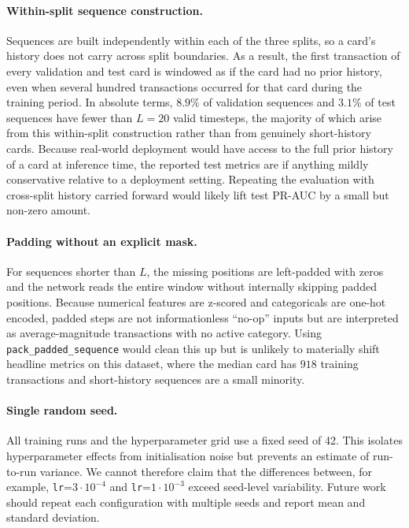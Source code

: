 \documentclass[oneside,12pt,parskip=half,american,numbers=noenddot]{scrreprt}
\begin{document}
\paragraph{Within-split sequence construction.}
Sequences are built independently within each of the three splits, so 
a card's history does not carry across split boundaries. As a result, 
the first transaction of every validation and test card is windowed 
as if the card had no prior history, even when several hundred 
transactions occurred for that card during the training period. In 
absolute terms, $8.9\%$ of validation sequences and $3.1\%$ of test 
sequences have fewer than $L=20$ valid timesteps, the majority of 
which arise from this within-split construction rather than from 
genuinely short-history cards. Because real-world deployment would 
have access to the full prior history of a card at inference time, 
the reported test metrics are if anything mildly conservative relative 
to a deployment setting. Repeating the evaluation with cross-split 
history carried forward would likely lift test PR-AUC by a small but 
non-zero amount.

\paragraph{Padding without an explicit mask.}
For sequences shorter than $L$, the missing positions are left-padded 
with zeros and the network reads the entire window without internally 
skipping padded positions. Because numerical features are z-scored 
and categoricals are one-hot encoded, padded steps are not 
informationless ``no-op'' inputs but are interpreted as 
average-magnitude transactions with no active category. Using 
\texttt{pack\_padded\_sequence} would clean this up but is unlikely to 
materially shift headline metrics on this dataset, where the median 
card has $918$ training transactions and short-history sequences are 
a small minority.

\paragraph{Single random seed.}
All training runs and the hyperparameter grid use a fixed seed of 42. 
This isolates hyperparameter effects from initialisation noise but 
prevents an estimate of run-to-run variance. We cannot therefore claim 
that the differences between, for example, \texttt{lr}=$3 \cdot 10^{-4}$ 
and \texttt{lr}=$1 \cdot 10^{-3}$ exceed seed-level variability. Future 
work should repeat each configuration with multiple seeds and report 
mean and standard deviation.
\end{document}
